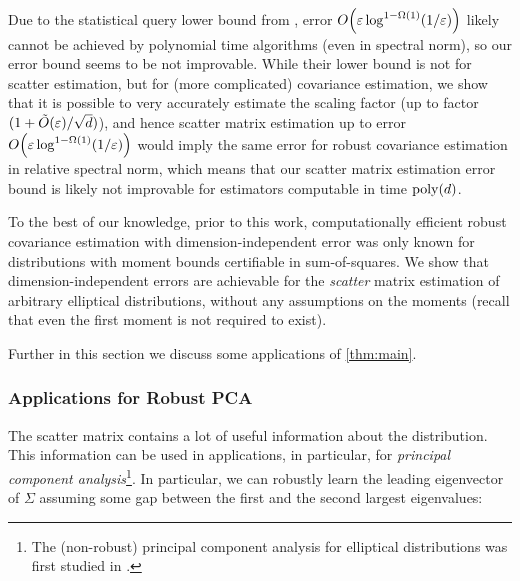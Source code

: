 Due to the statistical query lower bound from \cite{SQ-bounds}, error $O\Paren{\e\log^{1-\Omega(1)}(1/\e)}$ likely cannot be achieved by polynomial time algorithms (even in spectral norm), so our error bound seems to be not improvable. While their lower bound is not for scatter estimation, but for (more complicated) covariance estimation, we show that it is possible to very accurately estimate the scaling factor (up to factor $(1 + \tilde{O}(\varepsilon)/\sqrt{d})$), and hence  scatter matrix estimation  up to error $O\Paren{\e\log^{1-\Omega(1)}(1/\e)}$ would imply the same error for robust covariance estimation in relative spectral norm, which means that our scatter matrix estimation error bound is likely not improvable for estimators computable in time $\operatorname{poly}(d)$.

 To the best of our knowledge, prior to this work, computationally efficient robust covariance estimation with dimension-independent error was only known for distributions with moment bounds certifiable in sum-of-squares. We show that dimension-independent errors are achievable for the \emph{scatter} matrix estimation of arbitrary elliptical distributions, without any assumptions on the moments (recall that even the first moment is not required to exist).


Further in this section we discuss some applications of \cref{thm:main}.

\subsubsection{Applications for Robust PCA}

The scatter matrix contains a lot of useful information about the distribution. This information can be used in applications, in particular, for \emph{principal component analysis}\footnote{The (non-robust) principal component analysis for elliptical distributions was first studied in \cite{ECA}.}. In particular, we can robustly learn the leading eigenvector of $\Sigma$ assuming some gap between the first and the second largest eigenvalues:

